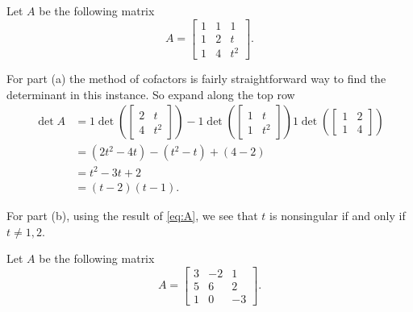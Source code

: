 \begin{questions}
  \question Let $A$ be the following matrix
  \[
    A=
    \begin{bmatrix}
      1&1&1\\
      1&2&t\\
      1&4&t^2
    \end{bmatrix}.
  \]
  \begin{solution}
    For part (a) the method of cofactors is fairly straightforward way to
    find the determinant in this instance. So expand along the top row
    \[
      \label{eq:A}
      \tag{$\bigstar$}
      \begin{aligned}
        \det A
        &=%
        1\det\left(\begin{bmatrix}2&t\\4&t^2\end{bmatrix}\right)%
        -1\det\left(\begin{bmatrix}1&t\\1&t^2\end{bmatrix}\right)%
        1\det\left(\begin{bmatrix}1&2\\1&4\end{bmatrix}\right)\\%
        &=(2t^2-4t)-(t^2-t)+(4-2)\\%
        &=t^2-3t+2\\
        &=(t-2)(t-1).
      \end{aligned}
    \]

    For part (b), using the result of \eqref{eq:A}, we see that $t$ is
    nonsingular if and only if $t\neq 1,2$.
  \end{solution}
  \question Let $A$ be the following matrix
  \[
    A=
    \begin{bmatrix}
      3&-2&1\\
      5&6&2\\
      1&0&-3
    \end{bmatrix}.
  \]
  \begin{parts}

\end{parts}
\end{questions}
